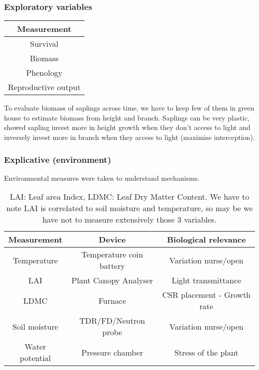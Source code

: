 \documentclass[12pt]{article} %
\begin{document}
\subsubsection{Exploratory variables}
\begin{table}[h]
\begin{center}
\begin{tabular}{c}
Measurement \\ 
\hline
Survival \\ 
Biomass \\ 
Phenology \\ 
Reproductive output \\
\hline 
\end{tabular}
\end{center}
\end{table} 
To evaluate biomass of saplings across time, we have to keep few of them in green house to estimate biomass from height and branch. Saplings can be very plastic, \citet{Bonser1994} showed sapling invest more in height growth when they don't access to light and inversely invest more in branch when they access to light (maximise interception). 

\subsubsection{Explicative (environment)}
Environmental measures were taken to understand mechanisms.
\begin{table}[h]
\begin{center}
\begin{tabular}{ccc}
Measurement & Device & Biological relevance\\
\hline
Temperature & Temperature coin battery & Variation nurse/open\\
LAI & Plant Canopy Analyser & Light transmittance\\
LDMC & Furnace & CSR placement - Growth rate\\
Soil moisture & TDR/FD/Neutron probe & Variation nurse/open\\
Water potential & Pressure chamber & Stress of the plant\\
\hline 
\end{tabular}
\caption{LAI: Leaf area Index, LDMC: Leaf Dry Matter Content. We have to note LAI is correlated to soil moisture and temperature, so may be we have not to measure extensively those 3 variables.}
\end{center}
\end{table}
\end{document}
